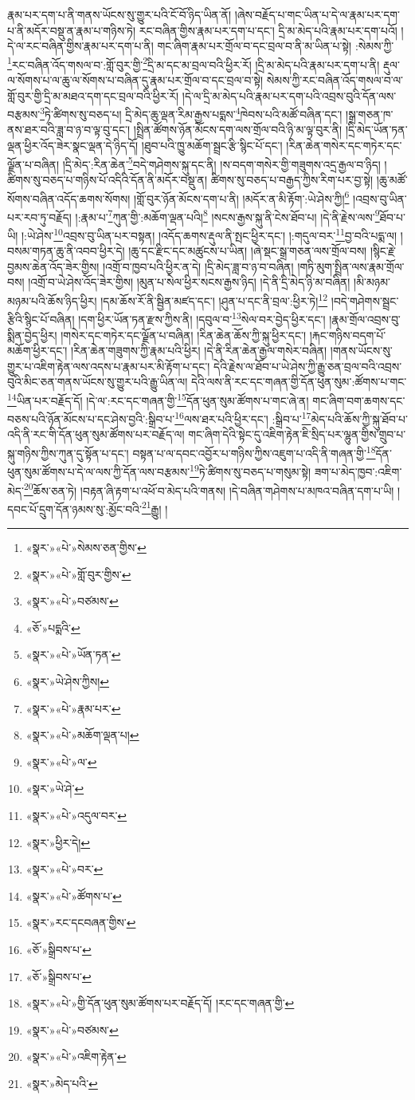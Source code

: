རྣམ་པར་དག་པ་ནི་གནས་ཡོངས་སུ་གྱུར་པའི་ངོ་བོ་ཉིད་ཡིན་ནོ། །ཞེས་བརྗོད་པ་གང་ཡིན་པ་དེ་ལ་རྣམ་པར་དག་པ་ནི་མདོར་བསྡུ་ན་རྣམ་པ་གཉིས་ཏེ། རང་བཞིན་གྱིས་རྣམ་པར་དག་པ་དང་། དྲི་མ་མེད་པའི་རྣམ་པར་དག་པའོ། །དེ་ལ་རང་བཞིན་གྱིས་རྣམ་པར་དག་པ་ནི། གང་ཞིག་རྣམ་པར་གྲོལ་བ་དང་བྲལ་བ་ནི་མ་ཡིན་པ་སྟེ། :སེམས་ཀྱི་\footnote{«སྣར་»«པེ་»སེམས་ཅན་གྱིས་}རང་བཞིན་འོད་གསལ་བ་:གློ་བུར་གྱི་\footnote{«སྣར་»«པེ་»གློ་བུར་གྱིས་}དྲི་མ་དང་མ་བྲལ་བའི་ཕྱིར་རོ། །དྲི་མ་མེད་པའི་རྣམ་པར་དག་པ་ནི། རྡུལ་ལ་སོགས་པ་ལ་ཆུ་ལ་སོགས་པ་བཞིན་དུ་རྣམ་པར་གྲོལ་བ་དང་བྲལ་བ་སྟེ། སེམས་ཀྱི་རང་བཞིན་འོད་གསལ་བ་ལ་གློ་བུར་གྱི་དྲི་མ་མཐའ་དག་དང་བྲལ་བའི་ཕྱིར་རོ། །དེ་ལ་དྲི་མ་མེད་པའི་རྣམ་པར་དག་པའི་འབྲས་བུའི་དོན་ལས་བརྩམས་\footnote{«སྣར་»«པེ་»བཙམས་}ཏེ་ཚིགས་སུ་བཅད་པ། དྲི་མེད་ཆུ་ལྡན་རིམ་རྒྱས་པདྨས་\footnote{«ཅོ་»པདྨའི་}ཁེབས་པའི་མཚོ་བཞིན་དང་། །སྒྲ་གཅན་ཁ་ནས་ཐར་བའི་ཟླ་བ་ཉ་བ་ལྟ་བུ་དང་། །སྤྲིན་ཚོགས་ཉོན་མོངས་དག་ལས་གྲོལ་བའི་ཉི་མ་ལྟ་བུར་ནི། །དྲི་མེད་ཡོན་ཏན་ལྡན་ཕྱིར་འོད་ཟེར་སྣང་ལྡན་དེ་ཉིད་དོ། །ཐུབ་པའི་ཁྱུ་མཆོག་སྦྲང་རྩི་སྙིང་པོ་དང་། །རིན་ཆེན་གསེར་དང་གཏེར་དང་ལྗོན་པ་བཞིན། །དྲི་མེད་:རིན་ཆེན་\footnote{«སྣར་»«པེ་»ཡོན་ཏན་}བདེ་གཤེགས་སྐུ་དང་ནི། །ས་བདག་གསེར་གྱི་གཟུགས་འདྲ་རྒྱལ་བ་ཉིད། །ཚིགས་སུ་བཅད་པ་གཉིས་པོ་འདིའི་དོན་ནི་མདོར་བསྡུ་ན། ཚིགས་སུ་བཅད་པ་བརྒྱད་ཀྱིས་རིག་པར་བྱ་སྟེ། །ཆུ་མཚོ་སོགས་བཞིན་འདོད་ཆགས་སོགས། །གློ་བུར་ཉོན་མོངས་དག་པ་ནི། །མདོར་ན་མི་རྟོག་:ཡེ་ཤེས་ཀྱི།\footnote{«སྣར་»ཡེ་ཤེས་ཀྱིས།} །འབྲས་བུ་ཡིན་པར་རབ་ཏུ་བརྗོད། །:རྣམ་པ་\footnote{«སྣར་»«པེ་»རྣམ་པར་}ཀུན་གྱི་:མཆོག་ལྡན་པའི།\footnote{«སྣར་»«པེ་»མཆོག་ལྡན་པ།} །སངས་རྒྱས་སྐུ་ནི་ངེས་ཐོབ་པ། །དེ་ནི་རྗེས་ལས་\footnote{«སྣར་»«པེ་»ལ་}ཐོབ་པ་ཡི། །:ཡེ་ཤེས་\footnote{«སྣར་»ཡེ་ཤེ་}འབྲས་བུ་ཡིན་པར་བསྟན། །འདོད་ཆགས་རྡུལ་ནི་སྤང་ཕྱིར་དང་། །:གདུལ་བར་\footnote{«སྣར་»«པེ་»འདུལ་བར་}བྱ་བའི་པདྨ་ལ། །བསམ་གཏན་ཆུ་ནི་འབབ་ཕྱིར་དེ། །ཆུ་དང་རྫིང་དང་མཚུངས་པ་ཡིན། །ཞེ་སྡང་སྒྲ་གཅན་ལས་གྲོལ་བས། །སྙིང་རྗེ་བྱམས་ཆེན་འོད་ཟེར་གྱིས། །འགྲོ་བ་ཁྱབ་པའི་ཕྱིར་ན་དེ། །དྲི་མེད་ཟླ་བ་ཉ་བ་བཞིན། །གཏི་མུག་སྤྲིན་ལས་རྣམ་གྲོལ་བས། །འགྲོ་བ་ཡེ་ཤེས་འོད་ཟེར་གྱིས། །མུན་པ་སེལ་ཕྱིར་སངས་རྒྱས་ཉིད། །དེ་ནི་དྲི་མེད་ཉི་མ་བཞིན། །མི་མཉམ་མཉམ་པའི་ཆོས་ཉིད་ཕྱིར། །དམ་ཆོས་རོ་ནི་སྦྱིན་མཛད་དང་། །ཤུན་པ་དང་ནི་བྲལ་:ཕྱིར་ཏེ།\footnote{«སྣར་»ཕྱིར་དེ།} །བདེ་གཤེགས་སྦྲང་རྩིའི་སྙིང་པོ་བཞིན། །དག་ཕྱིར་ཡོན་ཏན་རྫས་ཀྱིས་ནི། །དབུལ་བ་\footnote{«སྣར་»«པེ་»བར་}སེལ་བར་བྱེད་ཕྱིར་དང་། །རྣམ་གྲོལ་འབྲས་བུ་སྨིན་བྱེད་ཕྱིར། །གསེར་དང་གཏེར་དང་ལྗོན་པ་བཞིན། །རིན་ཆེན་ཆོས་ཀྱི་སྐུ་ཕྱིར་དང་། །རྐང་གཉིས་བདག་པོ་མཆོག་ཕྱིར་དང་། །རིན་ཆེན་གཟུགས་ཀྱི་རྣམ་པའི་ཕྱིར། །དེ་ནི་རིན་ཆེན་རྒྱལ་གསེར་བཞིན། །གནས་ཡོངས་སུ་གྱུར་པ་འཇིག་རྟེན་ལས་འདས་པ་རྣམ་པར་མི་རྟོག་པ་དང་། དེའི་རྗེས་ལ་ཐོབ་པ་ཡེ་ཤེས་ཀྱི་རྒྱུ་ཅན་བྲལ་བའི་འབྲས་བུའི་མིང་ཅན་གནས་ཡོངས་སུ་གྱུར་པའི་རྒྱུ་ཡིན་ལ། དེའི་ལས་ནི་རང་དང་གཞན་གྱི་དོན་ཕུན་སུམ་:ཚོགས་པ་གང་\footnote{«སྣར་»«པེ་»ཚོགས་པ་}ཡིན་པར་བརྗོད་དོ། །དེ་ལ་:རང་དང་གཞན་གྱི་\footnote{«སྣར་»རང་དངབཞན་གྱིས་}དོན་ཕུན་སུམ་ཚོགས་པ་གང་ཞེ་ན། གང་ཞིག་བག་ཆགས་དང་བཅས་པའི་ཉོན་མོངས་པ་དང་ཤེས་བྱའི་:སྒྲིབ་པ་\footnote{«ཅོ་»སྒྲིབས་པ་}ལས་ཐར་པའི་ཕྱིར་དང་། :སྒྲིབ་པ་\footnote{«ཅོ་»སྒྲིབས་པ་}མེད་པའི་ཆོས་ཀྱི་སྐུ་ཐོབ་པ་འདི་ནི་རང་གི་དོན་ཕུན་སུམ་ཚོགས་པར་བརྗོད་ལ། གང་ཞིག་དེའི་སྟེང་དུ་འཇིག་རྟེན་ཇི་སྲིད་པར་ལྷུན་གྱིས་གྲུབ་པ་སྐུ་གཉིས་ཀྱིས་ཀུན་དུ་སྟོན་པ་དང་། བསྟན་པ་ལ་དབང་འབྱོར་པ་གཉིས་ཀྱིས་འཇུག་པ་འདི་ནི་གཞན་གྱི་\footnote{«སྣར་»«པེ་»གྱི་དོན་ཕུན་སུམ་ཚོགས་པར་བརྗོད་དོ། །རང་དང་གཞན་གྱི་}དོན་ཕུན་སུམ་ཚོགས་པ་དེ་ལ་ལས་ཀྱི་དོན་ལས་བརྩམས་\footnote{«སྣར་»«པེ་»བཙམས་}ཏེ་ཚིགས་སུ་བཅད་པ་གསུམ་སྟེ། ཟག་པ་མེད་ཁྱབ་:འཇིག་མེད་\footnote{«སྣར་»«པེ་»འཇིག་རྟེན་}ཆོས་ཅན་ཏེ། །བརྟན་ཞི་རྟག་པ་འཕོ་བ་མེད་པའི་གནས། །དེ་བཞིན་གཤེགས་པ་མཁའ་བཞིན་དག་པ་ཡི། །དབང་པོ་དྲུག་དོན་ཉམས་སུ་:མྱོང་བའི་\footnote{«སྣར་»མེད་པའི་}རྒྱུ། །

